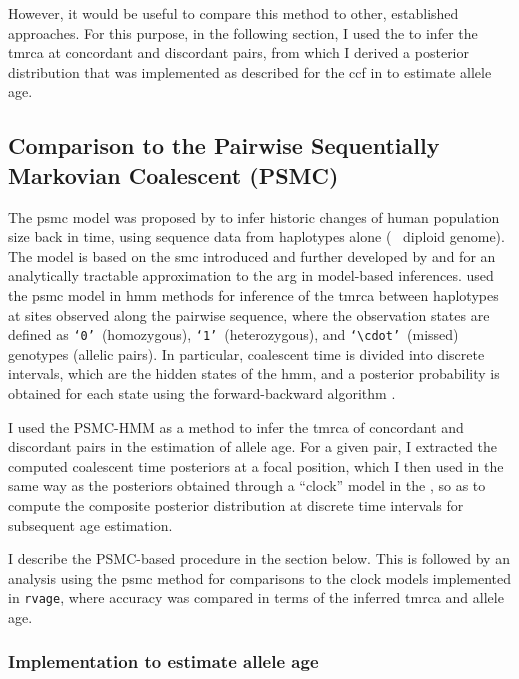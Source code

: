However, it would be useful to compare this method to other, established approaches.
For this purpose, in the following section, I used the  to infer the \gls{tmrca} at concordant and discordant pairs, from which I derived a posterior distribution that was implemented as described for the \gls{ccf} in  to estimate allele age.



%
\subsection{Comparison to the Pairwise Sequentially Markovian Coalescent (PSMC)}
\label{sec:psmc_eval}
%

The \gls{psmc} model was proposed by \citet{Li:2011ez} to infer historic changes of human population size back in time, using sequence data from  haplotypes alone (\ie~ diploid genome).
The model is based on the \gls{smc} introduced and further developed by \citet{McVean:2005ho} and \citet{marjoram2006fast} for an analytically tractable approximation to the \gls{arg} in model-based inferences.
 used the \Gls{psmc} model in \gls{hmm} methods for inference of the \gls{tmrca} between  haplotypes at sites observed along the pairwise sequence, where the observation states are defined as \texttt{`0'}~(homozygous), \texttt{`1'}~(heterozygous), and \texttt{`$\cdot$'}~(missed) genotypes (\ie allelic pairs).
In particular, coalescent time is divided into discrete intervals, which are the hidden states of the \gls{hmm}, and a posterior probability is obtained for each state using the forward-backward algorithm \citep[\eg, see][]{Rabiner:1989hs}.

I used the PSMC-HMM as a method to infer the \gls{tmrca} of concordant and discordant pairs in the estimation of allele age.
For a given pair, I extracted the computed coalescent time posteriors at a focal position, which I then used in the same way as the posteriors obtained through a ``clock'' model in the , so as to compute the composite posterior distribution at discrete time intervals for subsequent age estimation.

I describe the PSMC-based procedure in the section below.
This is followed by an analysis using the \gls{psmc} method for comparisons to the clock models implemented in \texttt{rvage}, where accuracy was compared in terms of the inferred \gls{tmrca} and allele age.


%
\subsubsection{Implementation to estimate allele age}
%


